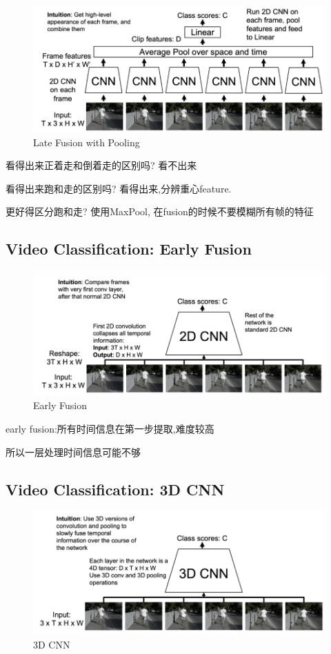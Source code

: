 \begin{figure}[htbp]
    \centering
    \includegraphics[scale=0.25]{figures/LF_pool.png}
    \caption{Late Fusion with Pooling}
\end{figure}

看得出来正着走和倒着走的区别吗? 看不出来

看得出来跑和走的区别吗? 看得出来,分辨重心feature.

更好得区分跑和走? 使用MaxPool, 在fusion的时候不要模糊所有帧的特征

\subsection{Video Classification: Early Fusion}

\begin{figure}[htbp]
    \centering
    \includegraphics[scale=0.25]{figures/EF.png}
    \caption{Early Fusion}
\end{figure}

early fusion:所有时间信息在第一步提取,难度较高

所以一层处理时间信息可能不够

\subsection{Video Classification: 3D CNN}

\begin{figure}[htbp]
    \centering
    \includegraphics[scale=0.25]{figures/3DCNN.png}
    \caption{3D CNN}
\end{figure}

